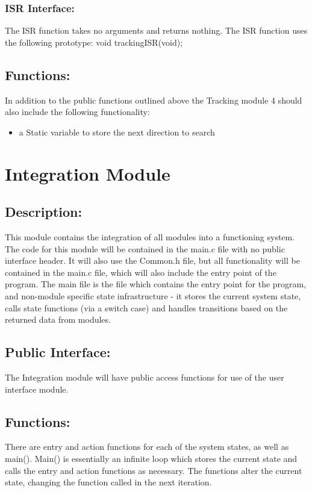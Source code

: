 \documentclass[]{article}
\begin{document}
\subsubsection{ISR Interface:}
The ISR function takes no arguments and returns nothing. The ISR function uses the following prototype: \newline \newline
void trackingISR(void);

\subsection{Functions:}
In addition to the public functions outlined above the Tracking module 4	should also include the following functionality:
\begin{itemize}
	\item a Static variable to store the next direction to search
\end{itemize}

\newpage
\section{Integration Module}

\subsection{Description:}
This module contains the integration of all modules into a functioning system. The code for this module will be contained in the main.c file with no public interface header. It will also use the Common.h file, but all functionality will be contained in the main.c file, which will also include the entry point of the program.
The main file is the file which contains the entry point for the program, and non-module specific state infrastructure - it stores the current system state, calls state functions (via a switch case) and handles transitions based on the returned data from modules.

\subsection{Public Interface:}
The Integration module will have public access functions for use of the user interface module.

\subsection{Functions:}
There are entry and action functions for each of the system states, as well as main(). Main() is essentially an infinite loop which stores the current state and calls the entry and action functions as necessary. The functions alter the current state, changing the function called in the next iteration.
\end{document}
